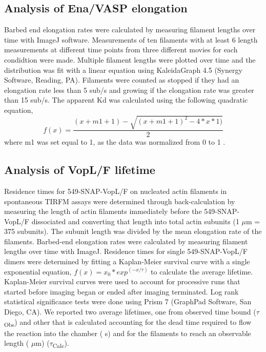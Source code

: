 \subsection{Analysis of Ena/VASP elongation}
Barbed end elongation rates were calculated by measuring filament lengths over time with ImageJ software. Measurements of ten filaments with at least 6 length measurements at different time points from three different movies for each condidtion were made.  Multiple filament lengths were plotted over time and the distribution was fit with a linear equation using KaleidaGraph 4.5 (Synergy Software, Reading, PA). Filaments were counted as stopped if they had an elongation rate less than 5 sub/s and growing if the elongation rate was greater than 15 sub/s. The apparent Kd was calculated using the following quadratic equation, \[f(x) = \frac{(x + m1 + 1)-\sqrt{(x+m1+1)^2-4*x*1)}}{2}\] where m1 was set equal to 1, as the data was normalized from 0 to 1 \citep{pollard_guide_2010}.

\subsection{Analysis of VopL/F lifetime}
Residence times for 549-SNAP-VopL/F on nucleated actin filaments in spontaneous TIRFM assays were determined through back-calculation by measuring the length of actin filaments immediately before the 549-SNAP-VopL/F dissociated and converting that length into total actin subunits (1 $\mu$m = 375 subunits). The subunit length was divided by the mean elongation rate of the filaments. Barbed-end elongation rates were calculated by measuring filament lengths over time with ImageJ. Residence times for single 549-SNAP-VopL/F dimers were determined by fitting a Kaplan-Meier \citep{kaplan_nonparametric_1958} survival curve with a single exponential equation, $f(x) = x_{0} * exp^{(-x/\tau)}$ to calculate the average lifetime. Kaplan-Meier survival curves were used to account for processive runs that started before imaging began or ended after imaging terminated. Log rank statistical significance tests were done using Prism 7 (GraphPad Software, San Diego, CA). We reported two average lifetimes, one from observed time bound ($\tau$\textsubscript{Obs}) and other that is calculated accounting for the dead time required to flow the reaction into the chamber ( s) and for the filaments to reach an observable length ( $\mu$m) ($\tau$\textsubscript{Calc}).


